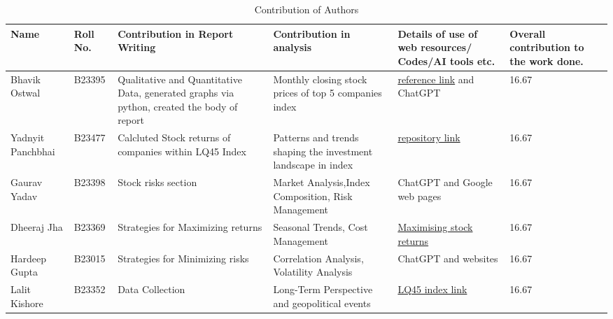 \begin{table}[H]
    \centering
    \caption{Contribution of Authors}
    \begin{tabular}{|p{1.8cm}|p{1.3cm}|p{2.5cm}|p{3cm}|p{2cm}|p{2cm}|}
        \hline
        \textbf{Name} & \textbf{Roll No.} & \textbf{Contribution in Report Writing} & \textbf{Contribution in analysis} &\textbf{Details of use of web resources/ Codes/AI tools etc.} & \textbf{Overall contribution to the work done.} \\
        \hline
        Bhavik Ostwal & B23395 & Qualitative and Quantitative Data, generated graphs via python, created the body of report  &  Monthly closing stock prices of top 5 companies index &  \href{https://idx.co.id/media/4842/idx-annual-statistics-2018.pdf}{reference link} and ChatGPT & 16.67  \\
        \hline
        Yadnyit Panchbhai & B23477 & Calcluted Stock returns of companies within LQ45 Index &  Patterns and trends shaping the investment landscape in index   &  \href{https://repository.ipmi.ac.id/1945/}{repository link}  &  16.67  \\
        \hline
        Gaurav Yadav & B23398 & Stock risks section & Market Analysis,Index Composition, Risk Management &  ChatGPT and Google web pages  &  16.67  \\
        \hline
        Dheeraj Jha & B23369 & Strategies for Maximizing returns  & Seasonal Trends, Cost Management & \href{https://www.investopedia.com/terms/s/stockreturn.asp; https://www.thebalance.com/how-to-calculate-stock-returns-4683693; https://www.forbes.com/sites/forbesfinancecouncil/2020/06/01/5-strategies-to-maximize-your-investment-returns/?sh=5f13704f7fc9}{Maximising stock returns}   &  16.67   \\
        \hline
        Hardeep Gupta & B23015 & Strategies for Minimizing risks & Correlation Analysis, Volatility Analysis& ChatGPT and websites   & 16.67 \\
        \hline
        Lalit Kishore & B23352 & Data Collection & Long-Term Perspective and geopolitical events & \href{https://www.investing.com/indices/jakarta-lq45-historical-data}{LQ45 index link} & 16.67 \\
        \hline
    \end{tabular}
\end{table}
